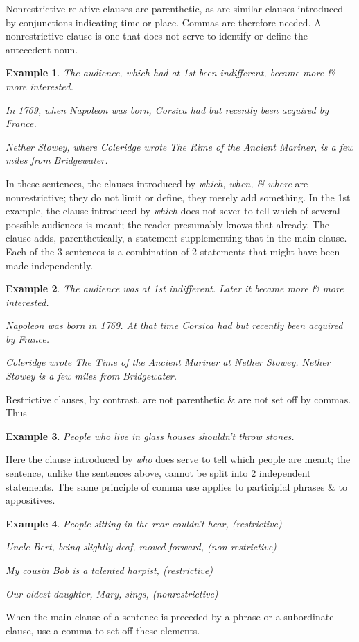 \documentclass[oneside]{book}
\numberwithin{equation}{section}
\newtheorem{example}{Example}[chapter]
\begin{document}
Nonrestrictive relative clauses are parenthetic, as are similar clauses introduced by conjunctions indicating time or place. Commas are therefore needed. A nonrestrictive clause is one that does not serve to identify or define the antecedent noun.

\begin{example}
	The audience, which had at 1st been indifferent, became more \& more interested.
	
	In 1769, when Napoleon was born, Corsica had but recently been acquired by France.
	
	Nether Stowey, where Coleridge wrote The Rime of the Ancient Mariner, is a few miles from Bridgewater.
\end{example}
In these sentences, the clauses introduced by \textit{which, when, \& where} are nonrestrictive; they do not limit or define, they merely add something. In the 1st example, the clause introduced by \textit{which} does not sever to tell which of several possible audiences is meant; the reader presumably knows that already. The clause adds, parenthetically, a statement supplementing that in the main clause. Each of the 3 sentences is a combination of 2 statements that might have been made independently.

\begin{example}
	The audience was at 1st indifferent. Later it became more \& more interested.
	
	Napoleon was born in 1769. At that time Corsica had but recently been acquired by France.
	
	Coleridge wrote The Time of the Ancient Mariner at Nether Stowey. Nether Stowey is a few miles from Bridgewater.
\end{example}
Restrictive clauses, by contrast, are not parenthetic \& are not set off by commas. Thus

\begin{example}
	People who live in glass houses shouldn't throw stones.
\end{example}
Here the clause introduced by \textit{who} does serve to tell which people are meant; the sentence, unlike the sentences above, cannot be split into 2 independent statements. The same principle of comma use applies to participial phrases \& to appositives.

\begin{example}
	People sitting in the rear couldn't hear, \emph{(restrictive)}
	
	Uncle Bert, being slightly deaf, moved forward, \emph{(non-restrictive)}
	
	My cousin Bob is a talented harpist, \emph{(restrictive)}
	
	Our oldest daughter, Mary, sings, \emph{(nonrestrictive)}
\end{example}
When the main clause of a sentence is preceded by a phrase or a subordinate clause, use a comma to set off these elements.
\end{document}
